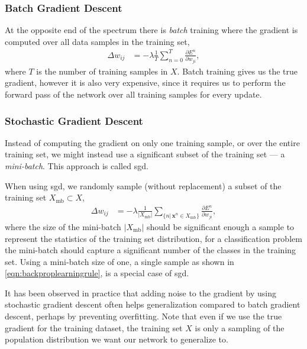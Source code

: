 \documentclass[thesis]{subfiles}
\begin{document}
\subsubsection{Batch Gradient Descent}
At the opposite end of the spectrum there is \emph{batch} training where the gradient is computed over all data samples in the training set,
\begin{equation}
\begin{aligned}
    \Delta w_{ij} &= -\lambda\frac{1}{T} \sum^T_{n=0} \frac{\partial E^n}{\partial w_{ji}},
     \label{eqn:batchlearningrule}
\end{aligned}
\end{equation}
%
where $T$ is the number of training samples in $X$. Batch training gives us the true gradient, however it is also very expensive, since it requires us to perform the forward pass of the network over all training samples for every update. 

\subsubsection{Stochastic Gradient Descent}
Instead of computing the gradient on only one training sample, or over the entire training set, we might instead use a significant subset of the training set --- a \emph{mini-batch}. This approach is called \gls{sgd}.

When using \gls{sgd}, we randomly sample (without replacement) a subset of the training set $X_{\textrm{mb}} \subset X$,
\begin{equation}
\begin{aligned}
    \Delta w_{ij} &= -\lambda \frac{1}{|X_{\textrm{mb}}|} \sum_{\{n|\,\mathbf{x}^n \in X_{\textrm{mb}}\}} \frac{\partial E^n}{\partial w_{ji}},
     \label{eqn:sgdrule}
\end{aligned}
\end{equation}
where the size of the mini-batch $|X_{\textrm{mb}}|$ should be significant enough a sample to represent the statistics of the training set distribution, \ie{}for a classification problem the mini-batch should capture a significant number of the classes in the training set. Using a mini-batch size of one, \ie{}a single sample as shown in \cref{eqn:backproplearningrule}, is a special case of \gls{sgd}. 

It has been observed in practice that adding noise to the gradient by using stochastic gradient descent often helps generalization compared to batch gradient descent, perhaps by preventing overfitting. Note that even if we use the true gradient for the training dataset, the training set $X$ is only a sampling of the population distribution we want our network to generalize to.
\end{document}
